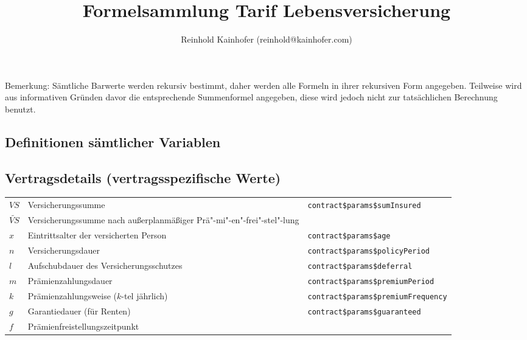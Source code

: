 \documentclass[a4paper,10pt]{article}
\title{\textbf{Formelsammlung Tarif Lebensversicherung}}
\author{Reinhold Kainhofer (reinhold@kainhofer.com)}
\begin{document}
\maketitle

% 

Bemerkung: Sämtliche Barwerte werden rekursiv bestimmt, daher werden alle Formeln in ihrer rekursiven Form angegeben. Teilweise wird aus informativen Gründen davor die entsprechende Summenformel angegeben, diese wird jedoch nicht zur tatsächlichen Berechnung benutzt. 

\tableofcontents


\begin{landscape}
\section{Definitionen sämtlicher Variablen}

\subsection{Vertragsdetails (vertragsspezifische Werte)}

\newenvironment{deftab}{\begin{longtable}{p{1.7cm}p{13cm}p{9cm}}}{\end{longtable}}

\begin{deftab}
 $VS$ & Versicherungssumme & \texttt{contract\$params\$sumInsured}\\
 $\widetilde{VS}$ & Versicherungssumme nach außerplanmäßiger Prä"-mi"-en"-frei"-stel"-lung\\[0.5em]
 $x$ & Eintrittsalter der versicherten Person & \texttt{contract\$params\$age}\\
 $n$ & Versicherungsdauer & \texttt{contract\$params\$policyPeriod}\\
 $l$ & Aufschubdauer des Versicherungsschutzes & \texttt{contract\$params\$deferral}\\
 $m$ & Prämienzahlungsdauer & \texttt{contract\$params\$premiumPeriod}\\
 $k$ & Prämienzahlungsweise ($k$-tel jährlich) & \texttt{contract\$params\$premiumFrequency}\\
 $g$ & Garantiedauer (für Renten)  & \texttt{contract\$params\$guaranteed}\\
 $f$ & Prämienfreistellungszeitpunkt\\[0.5em]
 

\end{deftab}
\end{landscape}
\end{document}
